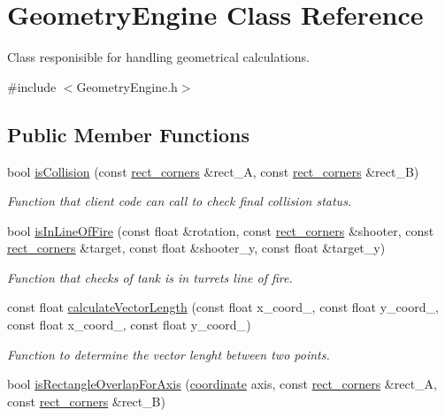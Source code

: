 \hypertarget{classGeometryEngine}{\section{Geometry\-Engine Class Reference}
\label{classGeometryEngine}
}


Class responisible for handling geometrical calculations.  




{\ttfamily \#include $<$Geometry\-Engine.\-h$>$}

\subsection*{Public Member Functions}
\begin{DoxyCompactItemize}
\item 
bool \hyperlink{classGeometryEngine_a049acffe89f53be25fbc9d4018c3b388}{is\-Collision} (const \hyperlink{structrect__corners}{rect\-\_\-corners} \&rect\-\_\-\-A, const \hyperlink{structrect__corners}{rect\-\_\-corners} \&rect\-\_\-\-B)
\begin{DoxyCompactList}\small\item\em Function that client code can call to check final collision status. \end{DoxyCompactList}\item 
bool \hyperlink{classGeometryEngine_af21c9c2e172169130af88fa6f3aa5fe7}{is\-In\-Line\-Of\-Fire} (const float \&rotation, const \hyperlink{structrect__corners}{rect\-\_\-corners} \&shooter, const \hyperlink{structrect__corners}{rect\-\_\-corners} \&target, const float \&shooter\-\_\-y, const float \&target\-\_\-y)
\begin{DoxyCompactList}\small\item\em Function that checks of tank is in turrets line of fire. \end{DoxyCompactList}\item 
const float \hyperlink{classGeometryEngine_a99634c40d20ab72ab30289a6ff4abe39}{calculate\-Vector\-Length} (const float x\-\_\-coord\-\_, const float y\-\_\-coord\-\_, const float x\-\_\-coord\-\_, const float y\-\_\-coord\-\_)
\begin{DoxyCompactList}\small\item\em Function to determine the vector lenght between two points. \end{DoxyCompactList}\item 
bool \hyperlink{classGeometryEngine_a1cd3abed45085b76e4145ac91fd1275e}{is\-Rectangle\-Overlap\-For\-Axis} (\hyperlink{structcoordinate}{coordinate} axis, const \hyperlink{structrect__corners}{rect\-\_\-corners} \&rect\-\_\-\-A, const \hyperlink{structrect__corners}{rect\-\_\-corners} \&rect\-\_\-\-B)

\end{DoxyCompactItemize}
